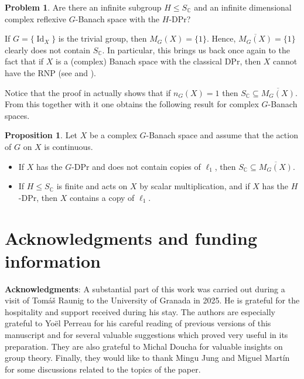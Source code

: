 \documentclass[a4paper,12pt]{amsart}
\theoremstyle{definition}
\newtheorem{proposition}[theorem]{Proposition}
\theoremstyle{definition}
\newtheorem{problem}[theorem]{Problem}
\theoremstyle{remark}
\numberwithin{equation}{section}
\newcommand{\C}{\mathbb{C}}
\DeclareMathOperator{\id}{Id}
\renewcommand{\leq}{\leqslant}
\newcommand{\<}{\langle}
\renewcommand{\>}{\rangle}
\begin{document}
	\begin{problem} Are there an infinite subgroup $H \leq S_{\C}$ and an infinite dimensional complex reflexive $G$-Banach space with the $H$-DPr?
	\end{problem}
	
	
	
	
	
	
	If $G = \{\id_X\}$ is the trivial group, then $M_G(X) = \{1\}$. Hence, $\overline{M_G(X)} = \{1\}$ clearly does not contain $S_{\C}$. In particular, this brings us back once again to the fact that if $X$ is a (complex) Banach space with the classical DPr, then $X$ cannot have the RNP (see  and ).
	
	
	Notice that the proof in  actually shows that if $n_G(X)=1$ then $S_{\mathbb{C}}\subseteq \overline{M_G(X)}$. From this together with  it one obtains the following result for complex $G$-Banach spaces.
	
	
	\begin{proposition} Let $X$ be a complex $G$-Banach space and assume that the action of $G$ on $X$ is continuous.
		\begin{itemize}
			\item[(a)] If $X$ has the $G$-DPr and does not contain copies of $\ell_1$, then $S_{\C} \subseteq \overline{M_G(X)}$.
			\item[(b)] If $H \leq S_{\C}$ is finite and acts on $X$ by scalar multiplication, and if $X$ has the $H$-DPr, then $X$ contains a copy of $\ell_1$. 
		\end{itemize}
	\end{proposition}
	
	\section{Acknowledgments and funding information} 
	
	
	\textbf{Acknowledgments}: A substantial part of this work was carried out during a visit of Tomáš Raunig to the University of Granada in 2025. He is grateful for the hospitality and support received during his stay. The authors are especially grateful to Yoël Perreau for his careful reading of previous versions of this manuscript and for several valuable suggestions which proved very useful in its preparation. They are also grateful to Michal Doucha for valuable insights on group theory. Finally, they would like to thank Mingu Jung and Miguel Martín for some discussions related to the topics of the paper.
	
\end{document}
